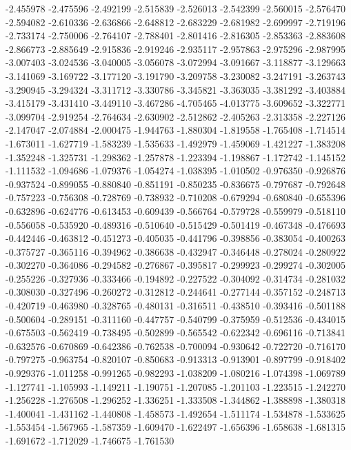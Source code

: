 -2.455978
-2.475596
-2.492199
-2.515839
-2.526013
-2.542399
-2.560015
-2.576470
-2.594082
-2.610336
-2.636866
-2.648812
-2.683229
-2.681982
-2.699997
-2.719196
-2.733174
-2.750006
-2.764107
-2.788401
-2.801416
-2.816305
-2.853363
-2.883608
-2.866773
-2.885649
-2.915836
-2.919246
-2.935117
-2.957863
-2.975296
-2.987995
-3.007403
-3.024536
-3.040005
-3.056078
-3.072994
-3.091667
-3.118877
-3.129663
-3.141069
-3.169722
-3.177120
-3.191790
-3.209758
-3.230082
-3.247191
-3.263743
-3.290945
-3.294324
-3.311712
-3.330786
-3.345821
-3.363035
-3.381292
-3.403884
-3.415179
-3.431410
-3.449110
-3.467286
-4.705465
-4.013775
-3.609652
-3.322771
-3.099704
-2.919254
-2.764634
-2.630902
-2.512862
-2.405263
-2.313358
-2.227126
-2.147047
-2.074884
-2.000475
-1.944763
-1.880304
-1.819558
-1.765408
-1.714514
-1.673011
-1.627719
-1.583239
-1.535633
-1.492979
-1.459069
-1.421227
-1.383208
-1.352248
-1.325731
-1.298362
-1.257878
-1.223394
-1.198867
-1.172742
-1.145152
-1.111532
-1.094686
-1.079376
-1.054274
-1.038395
-1.010502
-0.976350
-0.926876
-0.937524
-0.899055
-0.880840
-0.851191
-0.850235
-0.836675
-0.797687
-0.792648
-0.757223
-0.756308
-0.728769
-0.738932
-0.710208
-0.679294
-0.680840
-0.655396
-0.632896
-0.624776
-0.613453
-0.609439
-0.566764
-0.579728
-0.559979
-0.518110
-0.556058
-0.535920
-0.489316
-0.510640
-0.515429
-0.501419
-0.467348
-0.476693
-0.442446
-0.463812
-0.451273
-0.405035
-0.441796
-0.398856
-0.383054
-0.400263
-0.375727
-0.365116
-0.394962
-0.386638
-0.432947
-0.346448
-0.278024
-0.280922
-0.302270
-0.364086
-0.294582
-0.276867
-0.395817
-0.299923
-0.299274
-0.302005
-0.255226
-0.327936
-0.333466
-0.194892
-0.227522
-0.304092
-0.314734
-0.281032
-0.308030
-0.327496
-0.260272
-0.312812
-0.244641
-0.277144
-0.357152
-0.248713
-0.420719
-0.463980
-0.328765
-0.480131
-0.316511
-0.438510
-0.393416
-0.501188
-0.500604
-0.289151
-0.311160
-0.447757
-0.540799
-0.375959
-0.512536
-0.434015
-0.675503
-0.562419
-0.738495
-0.502899
-0.565542
-0.622342
-0.696116
-0.713841
-0.632576
-0.670869
-0.642386
-0.762538
-0.700094
-0.930642
-0.722720
-0.716170
-0.797275
-0.963754
-0.820107
-0.850683
-0.913313
-0.913901
-0.897799
-0.918402
-0.929376
-1.011258
-0.991265
-0.982293
-1.038209
-1.080216
-1.074398
-1.069789
-1.127741
-1.105993
-1.149211
-1.190751
-1.207085
-1.201103
-1.223515
-1.242270
-1.256228
-1.276508
-1.296252
-1.336251
-1.333508
-1.344862
-1.388898
-1.380318
-1.400041
-1.431162
-1.440808
-1.458573
-1.492654
-1.511174
-1.534878
-1.533625
-1.553454
-1.567965
-1.587359
-1.609470
-1.622497
-1.656396
-1.658638
-1.681315
-1.691672
-1.712029
-1.746675
-1.761530
